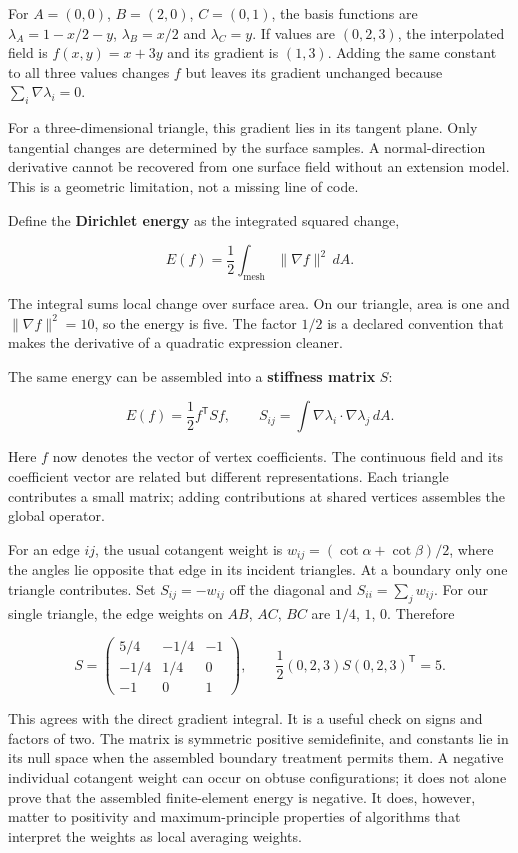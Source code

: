 For \(A=(0,0)\), \(B=(2,0)\), \(C=(0,1)\), the basis functions are \(\lambda_A=1-x/2-y\), \(\lambda_B=x/2\) and \(\lambda_C=y\). If values are \((0,2,3)\), the interpolated field is \(f(x,y)=x+3y\) and its gradient is \((1,3)\). Adding the same constant to all three values changes \(f\) but leaves its gradient unchanged because \(\sum_i\nabla\lambda_i=0\).

For a three-dimensional triangle, this gradient lies in its tangent plane. Only tangential changes are determined by the surface samples. A normal-direction derivative cannot be recovered from one surface field without an extension model. This is a geometric limitation, not a missing line of code.

Define the \textbf{Dirichlet energy} as the integrated squared change,

\[
E(f)=\frac12\int_{\text{mesh}}\|\nabla f\|^2\,dA.
\]

The integral sums local change over surface area. On our triangle, area is one and \(\|\nabla f\|^2=10\), so the energy is five. The factor \(1/2\) is a declared convention that makes the derivative of a quadratic expression cleaner.

The same energy can be assembled into a \textbf{stiffness matrix} \(S\):

\[
E(f)=\frac12 f^{\mathsf T}Sf,\qquad
S_{ij}=\int\nabla\lambda_i\cdot\nabla\lambda_j\,dA.
\]

Here \(f\) now denotes the vector of vertex coefficients. The continuous field and its coefficient vector are related but different representations. Each triangle contributes a small matrix; adding contributions at shared vertices assembles the global operator.

For an edge \(ij\), the usual cotangent weight is \(w_{ij}=(\cot\alpha+\cot\beta)/2\), where the angles lie opposite that edge in its incident triangles. At a boundary only one triangle contributes. Set \(S_{ij}=-w_{ij}\) off the diagonal and \(S_{ii}=\sum_jw_{ij}\). For our single triangle, the edge weights on \(AB\), \(AC\), \(BC\) are \(1/4\), \(1\), \(0\). Therefore

\[
S=\begin{pmatrix}5/4&-1/4&-1\\-1/4&1/4&0\\-1&0&1\end{pmatrix},
\qquad \frac12(0,2,3)S(0,2,3)^{\mathsf T}=5.
\]

This agrees with the direct gradient integral. It is a useful check on signs and factors of two. The matrix is symmetric positive semidefinite, and constants lie in its null space when the assembled boundary treatment permits them. A negative individual cotangent weight can occur on obtuse configurations; it does not alone prove that the assembled finite-element energy is negative. It does, however, matter to positivity and maximum-principle properties of algorithms that interpret the weights as local averaging weights.

